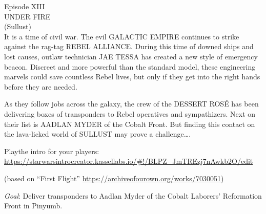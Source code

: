 \documentclass{book}
\begin{document}
Episode XIII\\
UNDER FIRE\\
(Sullust)\\

It is a time of civil war. The evil GALACTIC EMPIRE continues to strike against the rag-tag REBEL ALLIANCE. During this time of downed ships and lost causes, outlaw technician JAE TESSA has created a new style of emergency beacon. Discreet and more powerful than the standard model, these engineering marvels could save countless Rebel lives, but only if they get into the right hands before they are needed.

As they follow jobs across the galaxy, the crew of the DESSERT ROSÉ has been delivering boxes of transponders to Rebel operatives and sympathizers. Next on their list is AADLAN MYDER of the Cobalt Front. But finding this contact on the lava-licked world of SULLUST may prove a challenge….

Playthe intro for your players: \url{https://starwarsintrocreator.kassellabs.io/#!/BLPZ_JmTREzj7nAwkb2O/edit}

(based on ``First Flight'' \url{https://archiveofourown.org/works/7030051})

\emph{Goal}: Deliver transponders to Aadlan Myder of the Cobalt Laborers’ Reformation Front in Pinyumb.
\end{document}

